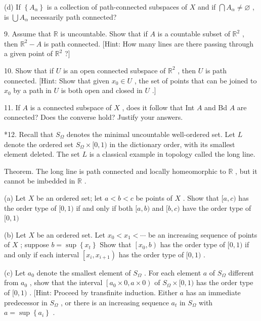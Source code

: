 (d) If \(\left\{  {A}_{\alpha }\right\}\) is a collection of path-connected subspaces of \(X\) and if \(\bigcap {A}_{\alpha } \neq  \varnothing\) , is \(\bigcup {A}_{\alpha }\) necessarily path connected?

9. Assume that \(\mathbb{R}\) is uncountable. Show that if \(A\) is a countable subset of \({\mathbb{R}}^{2}\) , then \({\mathbb{R}}^{2} - A\) is path connected. [Hint: How many lines are there passing through a given point of \({\mathbb{R}}^{2}\) ?]

10. Show that if \(U\) is an open connected subspace of \({\mathbb{R}}^{2}\) , then \(U\) is path connected. [Hint: Show that given \({x}_{0} \in  U\) , the set of points that can be joined to \({x}_{0}\) by a path in \(U\) is both open and closed in \(U\) .]

11. If \(A\) is a connected subspace of \(X\) , does it follow that Int \(A\) and Bd \(A\) are connected? Does the converse hold? Justify your answers.

*12. Recall that \({S}_{\Omega }\) denotes the minimal uncountable well-ordered set. Let \(L\) denote the ordered set \({S}_{\Omega } \times  \lbrack 0,1)\) in the dictionary order, with its smallest element deleted. The set \(L\) is a classical example in topology called the long line.

Theorem. The long line is path connected and locally homeomorphic to \(\mathbb{R}\) , but it cannot be imbedded in \(\mathbb{R}\) .

(a) Let \(X\) be an ordered set; let \(a < b < c\) be points of \(X\) . Show that \(\lbrack a,c)\) has the order type of \(\lbrack 0,1)\) if and only if both \(\lbrack a,b)\) and \(\lbrack b,c)\) have the order type of \(\lbrack 0,1)\)

(b) Let \(X\) be an ordered set. Let \({x}_{0} < {x}_{1} < \cdots\) be an increasing sequence of points of \(X\) ; suppose \(b = \sup \left\{  {x}_{t}\right\}\) Show that \(\left\lbrack  {{x}_{0},b}\right)\) has the order type of \(\lbrack 0,1)\) if and only if each interval \(\left\lbrack  {{x}_{i},{x}_{i + 1}}\right)\) has the order type of \(\lbrack 0,1)\) .

(c) Let \({a}_{0}\) denote the smallest element of \({S}_{\Omega }\) . For each element \(a\) of \({S}_{\Omega }\) different from \({a}_{0}\) , show that the interval \(\left\lbrack  {{a}_{0} \times  0,a \times  0}\right)\) of \({S}_{\Omega } \times  \lbrack 0,1)\) has the order type of \(\lbrack 0,1)\) . [Hint: Proceed by transfinite induction. Either \(a\) has an immediate predecessor in \({S}_{\Omega }\) , or there is an increasing sequence \({a}_{t}\) in \({S}_{\Omega }\) with \(a = \sup \left\{  {a}_{i}\right\}\) .

